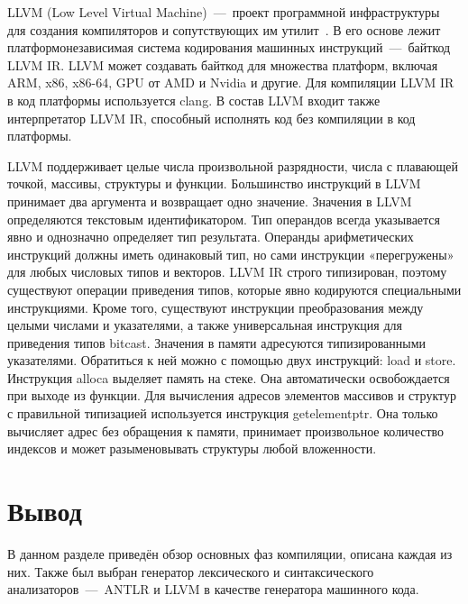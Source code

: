 LLVM (Low Level Virtual Machine)~---~проект программной инфраструктуры для создания компиляторов и сопутствующих им утилит~\cite{sarda2015llvm}. 
В его основе лежит платформонезависимая система кодирования машинных инструкций~---~байткод LLVM IR. 
LLVM может создавать байткод для множества платформ, включая ARM, x86, x86-64, GPU от AMD и Nvidia и другие. 
Для компиляции LLVM IR в код платформы используется clang. 
В состав LLVM входит также интерпретатор LLVM IR, способный исполнять код без компиляции в код платформы.

LLVM поддерживает целые числа произвольной разрядности, числа с плавающей точкой, массивы, структуры и функции. 
Большинство инструкций в LLVM принимает два аргумента и возвращает одно значение.
Значения в LLVM определяются текстовым идентификатором. 
Тип операндов всегда указывается явно и однозначно определяет тип результата. 
Операнды арифметических инструкций должны иметь одинаковый тип, но сами инструкции «перегружены» для любых числовых типов и векторов.
LLVM IR строго типизирован, поэтому существуют операции приведения типов, которые явно кодируются специальными инструкциями. 
Кроме того, существуют инструкции преобразования между целыми числами и указателями, а также универсальная инструкция для приведения типов bitcast.
Значения в памяти адресуются типизированными указателями. 
Обратиться к ней можно с помощью двух инструкций: load и store. Инструкция alloca выделяет память на стеке. 
Она автоматически освобождается при выходе из функции.
Для вычисления адресов элементов массивов и структур с правильной типизацией используется инструкция getelementptr. 
Она только вычисляет адрес без обращения к памяти, принимает произвольное количество индексов и может разыменовывать структуры любой вложенности.

\section{Вывод}

В данном разделе приведён обзор основных фаз компиляции, описана каждая из них. 
Также был выбран генератор лексического и синтаксического анализаторов~---~ANTLR и LLVM в качестве генератора машинного кода.


















 
